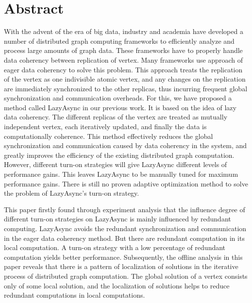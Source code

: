 \intobmk\chapter*{Abstract}%

With the advent of the era of big data, industry and academia have developed a number of distributed graph computing frameworks to efficiently analyze and process large amounts of graph data.
These frameworks have to properly handle data coherency between replication of vertex.
Many frameworks use approach of eager data coherency to solve this problem.
This approach treats the replication of the vertex as one indivisible atomic vertex, 
and any changes on the replication are immediately synchronized to the other replicas, 
thus incurring frequent global synchronization and communication overheads.
For this, we have proposed a method called LazyAsync in our previous work.
It is based on the idea of lazy data coherency.
The different replicas of the vertex are treated as mutually independent vertex, 
each iteratively updated, and finally the data is computationally coherence.
This method effectively reduces the global synchronization and communication caused 
by data coherency in the system, 
and greatly improves the efficiency of the existing distributed graph computation.
However, different turn-on strategies will give LazyAsync different levels of performance gains.
This leaves LazyAsync to be manually tuned for maximum performance gains.
There is still no proven adaptive optimization method to solve the problem of LazyAsync's turn-on strategy.

This paper firstly found through experiment analysis that 
the influence degree of different turn-on strategies on LazyAsync is mainly influenced by redundant computing.
LazyAsync avoids the redundant synchronization and communication in the eager data coherency method.
But there are redundant computation in its local computation.
A turn-on strategy with a low percentage of redundant computation yields better performance.
Subsequently, the offline analysis in this paper reveals that 
there is a pattern of localization of solutions in the iterative process of distributed graph computation.
The global solution of a vertex consists only of some local solution, 
and the localization of solutions helps to reduce redundant computations in local computations.

